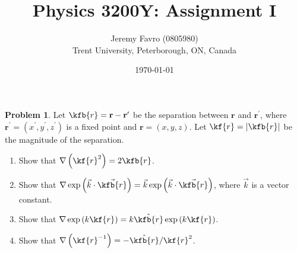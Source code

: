\documentclass[10pt]{article}
\title{Physics 3200Y: Assignment I}
\author{Jeremy Favro (0805980) \\ Trent University, Peterborough, ON, Canada}
\date{\today}
\theoremstyle{definition}
\newtheorem{problem}{Problem}
\newcommand{\scriptr}{\kf{r}}
\newcommand{\bscriptr}{\kfb{r}}
\newcommand{\bv}[1]{\mathbf{#1}}
\begin{document}
\maketitle

\begin{problem}
Let $\bscriptr=\bv{r}-\bv{r}^\prime$ be the separation between $\bv{r}$ and $\bv{r}^\prime$, where $\bv{r}^\prime = (x^\prime, y^\prime, z^\prime)$ is a fixed point and $\bv{r} = (x, y, z)$. Let
$\scriptr = \left|\bscriptr \right|$ be the magnitude of the separation.
\begin{enumerate}[label=(\alph*)]
  \item Show that $\nabla\left(\scriptr^2\right)=2\bscriptr$.
  \item Show that $\nabla\exp\left(\vec{k}\cdot\vec{\bscriptr}\right)=\vec{k}\exp\left(\vec{k}\cdot\vec{\bscriptr}\right)$, where $\vec{k}$ is a vector constant.
  \item Show that $\nabla\exp\left(k\scriptr\right)=k\hat{\bscriptr}\exp\left(k\scriptr\right)$.
  \item Show that $\nabla \left(\scriptr^{-1}\right)=-\hat{\bscriptr}/\scriptr^2$.
\end{enumerate}
\end{problem}
\end{document}
